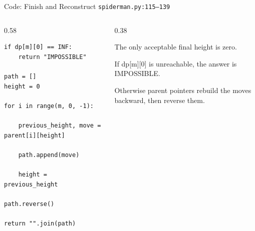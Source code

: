 \documentclass[aspectratio=169,11pt]{beamer}
\begin{document}
\begin{frame}[fragile]{Code: Finish and Reconstruct}
\scriptsize
{} \texttt{spiderman.py:115--139}

\vspace{0.08cm}
\begin{columns}[T,totalwidth=\textwidth]
\begin{column}{0.58\textwidth}
\begin{lstlisting}[style=cpcode]
if dp[m][0] == INF:
    return "IMPOSSIBLE"

path = []
height = 0

for i in range(m, 0, -1):

    previous_height, move = parent[i][height]

    path.append(move)

    height = previous_height

path.reverse()

return "".join(path)
\end{lstlisting}
\end{column}
\begin{column}{0.38\textwidth}
\begin{tightitemize}
  \item The only acceptable final height is zero.
  \item If dp[m][0] is unreachable, the answer is IMPOSSIBLE.
  \item Otherwise parent pointers rebuild the moves backward, then reverse them.
\end{tightitemize}
\end{column}
\end{columns}
\end{frame}
\end{document}
